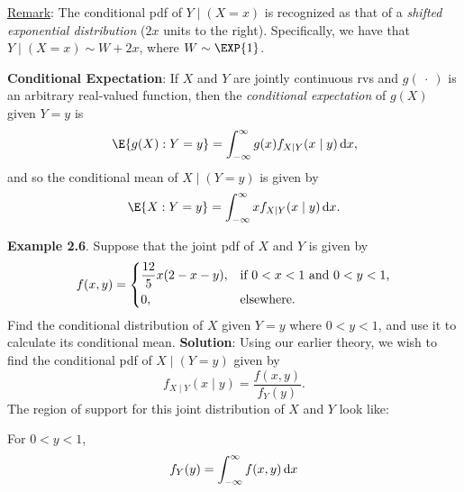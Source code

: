 \underline{Remark}: The conditional pdf of $ Y\mid (X=x) $ is recognized as that of a \emph{shifted exponential distribution}
($2x$ units to the right). Specifically, we have that $ Y\mid(X=x) \sim W+2x $, where $ W \sim \EXP{1} $.
\begin{Regular}
    \textbf{Conditional Expectation}: If $ X $ and $ Y $ are jointly continuous rvs and $ g(\:\cdot\:) $ is an arbitrary
    real-valued function, then the \emph{conditional expectation} of $ g(X) $ given $ Y=y $ is
    \[ \E{g(X)\given Y=y}=\int_{-\infty}^{\infty}g(x)f_{X\mid Y}(x\mid y)\odif{x}, \]
    and so the conditional mean of $ X\mid(Y=y) $ is given by
    \[ \E{X\given Y=y}=\int_{-\infty}^{\infty}x f_{X\mid Y}(x\mid y)\odif{x}. \]
\end{Regular}
\begin{Example}
    \textbf{Example 2.6}. Suppose that the joint pdf of $ X $ and $ Y $ is given by
    \[ f(x,y)=\begin{dcases}
            \frac{12}{5}x(2-x-y), & \text{if $ 0<x<1 $ and $ 0<y<1 $,} \\
            0,                    & \text{elsewhere}.
        \end{dcases} \]
    Find the conditional distribution of $ X $ given $ Y=y $ where $ 0<y<1 $, and use it to calculate its conditional mean.
    \tcblower{}
    \textbf{Solution}: Using our earlier theory, we wish to find the conditional pdf of $ X\mid(Y=y) $ given by
    \[ f_{X\mid Y}(x\mid y)=\frac{f(x,y)}{f_Y(y)}. \]
    The region of support for this joint distribution of $ X $ and $ Y $ look like:
    \begin{center}
    \end{center}
    For $ 0<y<1 $,
    \begin{align*}
        f_Y(y)
         & =\int_{-\infty}^{\infty}f(x,y)\odif{x}                                     \\

\end{align*}
\end{Example}
